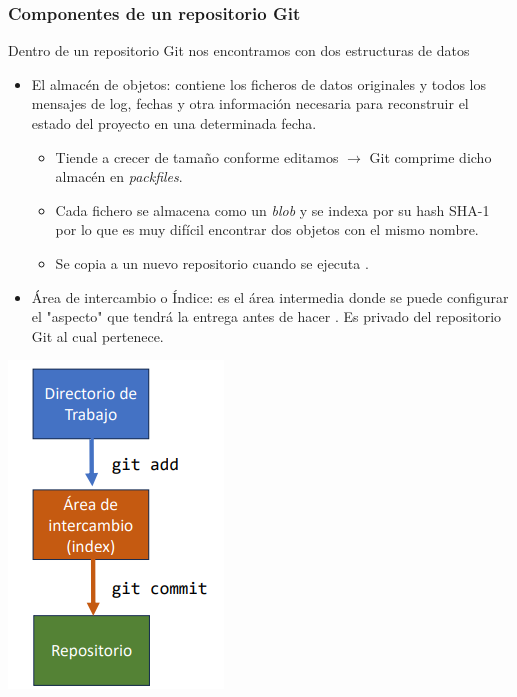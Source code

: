 \subsubsection*{\hspace{10pt}Componentes de un repositorio Git}
\begin{minipage}{0.5\textwidth}
	Dentro de un repositorio Git nos encontramos con dos estructuras de datos
\begin{itemize}
	\item El almacén de objetos: contiene los ficheros de datos originales y todos los mensajes de log, fechas y otra información necesaria para reconstruir el estado del proyecto en una determinada fecha.
\begin{itemize}
	\item Tiende a crecer de tamaño conforme editamos $\longrightarrow$ Git comprime dicho almacén en \textit{packfiles}.
\item Cada fichero se almacena como un \textit{blob} y se indexa por su hash SHA-1 por lo que es muy difícil encontrar dos objetos con el mismo nombre.
\item Se copia a un nuevo repositorio cuando se ejecuta .
\end{itemize}
\item Área de intercambio o Índice: es el área intermedia donde se puede configurar el "aspecto" que tendrá la entrega antes de hacer . Es privado del repositorio Git al cual
pertenece.
\end{itemize}
\end{minipage}\qquad\begin{minipage}{0.45\textwidth}
\begin{center}
	\includegraphics{"Temas/Tema 1/screenshot008"}
\end{center}
\end{minipage}
